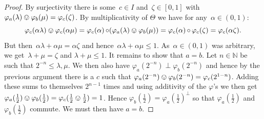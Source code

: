 \documentclass[a4paper, onecolumn, accepted=2020-12-22]{quantumarticle}
\DeclarePairedDelimiter{\floor}{\lfloor}{\rfloor}
\newcommand{\N}{\mathbb{N}}
\newcommand{\mult}{\mathop{\circ}}
\newcommand{\commu}{\mathrel{\lvert}}
\newcommand{\ncommu}{\mathrel{\not\lvert}}
\newcommand{\TODO}[1]{\textcolor{blue}{\emph{[ #1 ]}}}
\theoremstyle{definition}
\begin{document}
\begin{proof}
By surjectivity there is some~$c \in I$ and~$\zeta \in [0,1]$
    with~$\varphi_a(\lambda) \ovee \varphi_b(\mu) = \varphi_c(\zeta)$.
By multiplicativity of $\Theta$ we have for any~$\alpha \in (0,1)$:
    \[
         \varphi_c(\alpha \lambda) \ovee
          \varphi_c(\alpha \mu)
          =
    \varphi_c(\alpha) \mult (\varphi_a(\lambda) \ovee \varphi_b(\mu))
    = \varphi_c(\alpha) \mult \varphi_c (\zeta)
    = \varphi_c(\alpha\zeta).\]
    But then~$\alpha\lambda + \alpha\mu  = \alpha\zeta$ 
    and hence~$\alpha\lambda + \alpha\mu \leq 1$.
As~$\alpha \in (0,1)$ was arbitrary,
    we get~$\lambda + \mu = \zeta$ and $\lambda+\mu\leq 1$.
It remains to show that $a=b$.
Let $n\in \N$ be such that $2^{-n} \leq \lambda, \mu$.
We then also have $\varphi_a(2^{-n})\perp \varphi_b(2^{-n})$ 
and hence by the previous argument there is a $c$ such that
$\varphi_a(2^{-n})\ovee \varphi_b(2^{-n}) = \varphi_c(2^{1-n})$.
Adding these sums to themselves $2^{n-1}$ times and using additivity
of the $\varphi$'s we then get 
$\varphi_a(\frac12) \ovee \varphi_b(\frac12) = \varphi_c(\frac12 \ovee \frac12) = 1$.
Hence $\varphi_b(\frac12) = \varphi_a(\frac12)^\perp$ so that $\varphi_a(\frac12)$
and $\varphi_b(\frac12)$ commute. We must then have $a=b$.
\qedhere


\end{proof}
\end{document}

